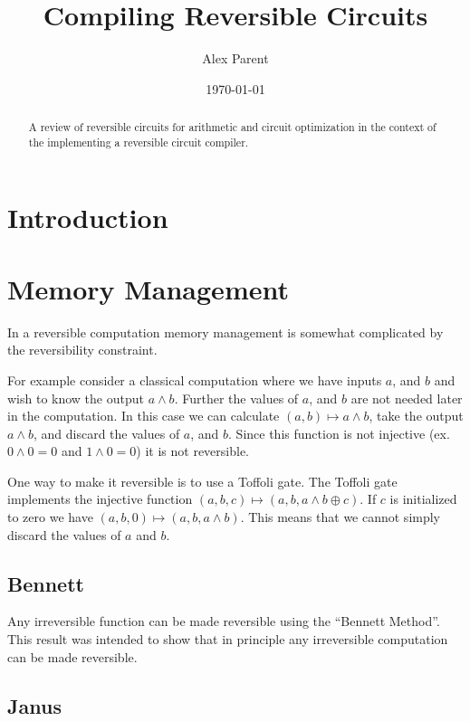 \documentclass{report}
\begin{document}
\listoftodos 

\title{Compiling Reversible Circuits}
\author{Alex Parent}
\date{\today}
\maketitle

\begin{abstract}
  A review of reversible circuits for arithmetic and circuit optimization in the context of the implementing a reversible circuit compiler.
\end{abstract}
\tableofcontents

\chapter{Introduction}


\chapter{Memory Management}

In a reversible computation memory management is somewhat complicated by the reversibility constraint.

For example consider a classical computation where we have inputs $a$, and $b$ and wish to know the output $a\land b$.
Further the values of $a$, and $b$ are not needed later in the computation.
In this case we can calculate $(a,b) \mapsto a \land b$, take the output $a\land b$, and discard the values of $a$, and $b$.
Since this function is not injective (ex. $0\land 0 = 0$ and $1 \land 0 = 0$) it is not reversible.

One way to make it reversible is to use a Toffoli gate.
The Toffoli gate implements the injective function $(a,b,c) \mapsto (a,b,a\land b \oplus c)$.
If $c$ is initialized to zero we have $(a,b,0) \mapsto (a,b,a\land b)$.
This means that we cannot simply discard the values of $a$ and $b$.

\section{Bennett}
Any irreversible function can be made reversible using the ``Bennett Method''\cite{Bennett:73}.
This result was intended to show that in principle any irreversible computation can be made reversible.


\section{Janus}
\end{document}
